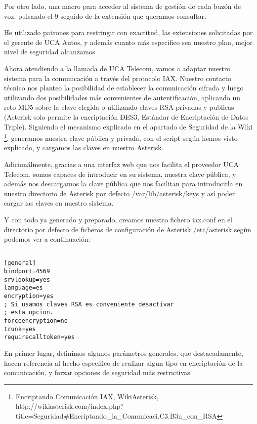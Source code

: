 Por otro lado, una macro para acceder al sistema de gestión de cada buzón de voz, pulsando el 9 seguido de la extensión que queramos consultar.

He utilizado patrones para restringir con exactitud, las extensiones solicitadas por el gerente de UCA Autos, y además cuanto más especifico sea nuestro plan, mejor nivel de seguridad alcanzamos.

Ahora atendiendo a la llamada de UCA Telecom, vamos a adaptar nuestro sistema para la comunicación a través del protocolo IAX. Nuestro contacto técnico nos planteo la posibilidad de establecer la comunicación cifrada y luego utilizando dos posibilidades más convenientes de autentificación, aplicando un reto MD5 sobre la clave elegida o utilizando claves RSA privadas y publicas (Asterisk solo permite la encriptación DES3, Estándar de Encriptación de Datos Triple). Siguiendo el mecanismo explicado en el apartado de Seguridad de la Wiki \footnote{Encriptando Comunicación IAX, WikiAsterisk, \\http://wikiasterisk.com/index.php?title=Seguridad\#Encriptando\_la\_Comunicaci.C3.B3n\_con\_RSA}, generamos nuestra clave pública y privada, con el script según hemos visto explicado, y cargamos las claves en nuestro Asterisk.

Adicionálmente, gracias a una interfaz web que nos facilita el proveedor UCA Telecom, somos capaces de introducir en su sistema, nuestra clave pública, y además nos descargamos la clave pública que nos facilitan para introducirla en nuestro directorio de Asterisk por defecto /var/lib/asterisk/keys y así poder cargar las claves en nuestro sistema.

Y con todo ya generado y preparado, creamos nuestro fichero iax.conf en el directorio por defecto de ficheros de configuración de Asterisk /etc/asterisk según podemos ver a continuación:

\begin{lstlisting}[style=bash,title={/etc/asterisk/iax.conf}]

[general]
bindport=4569
srvlookup=yes
language=es
encryption=yes
; Si usamos claves RSA es conveniente desactivar 
; esta opcion.
forceencryption=no
trunk=yes
requirecalltoken=yes

\end{lstlisting}

En primer lugar, definimos algunos parámetros generales, que destacadamente, hacen referencia al hecho específico de realizar algun tipo en encriptación de la comunicación, y forzar opciones de seguridad más restrictivas.

